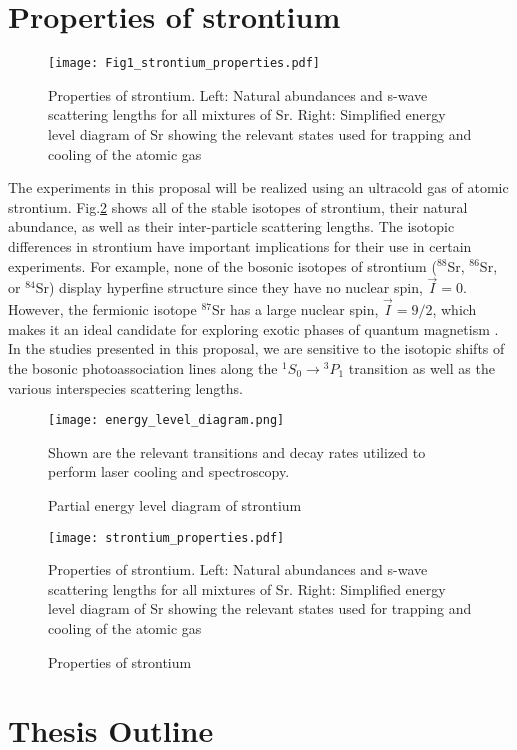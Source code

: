 \section{Properties of strontium}
\label{sec:sr}

	

	\begin{figure}
		\centerline{
		\texttt{[image: Fig1\_strontium\_properties.pdf]}}
		\caption{Properties of strontium. Left: Natural abundances and s-wave scattering lengths for all mixtures of Sr. Right: Simplified energy level diagram of Sr showing the relevant states used for trapping and cooling of the atomic gas}
	\end{figure} 
The experiments in this proposal will be realized using an ultracold gas of atomic strontium. Fig.\;\ref{fig:energy_level_diagram} shows all of the stable isotopes of strontium, their natural abundance, as well as their inter-particle scattering lengths. The isotopic differences in strontium have important implications for their use in certain experiments. For example, none of the bosonic isotopes of strontium ($^{88}$Sr, $^{86}$Sr, or $^{84}$Sr) display hyperfine structure since they have no nuclear spin, $\vec{I}=0$. However, the fermionic isotope $^{87}$Sr has a large nuclear spin, $\vec{I}=9/2$, which makes it an ideal candidate for exploring exotic phases of quantum magnetism \cite{Beverland2016,Cazalilla2014,Chen2015}. In the studies presented in this proposal, we are sensitive to the isotopic shifts of the bosonic photoassociation lines along the $^1S_0\!\rightarrow\!^3P_1$ transition as well as the various interspecies scattering lengths.

	\begin{figure} 
		\centerline{
		\texttt{[image: energy\_level\_diagram.png]}}
		\caption{Partial energy level diagram of strontium}{Shown are the relevant transitions and decay rates utilized to perform laser cooling and spectroscopy.}
		\label{fig:energyLevels}
	\end{figure}

\begin{figure}
\label{fig:energy_level_diagram}
	\centerline{
	\texttt{[image: strontium\_properties.pdf]}}
	\caption{Properties of strontium}{Properties of strontium. Left: Natural abundances and s-wave scattering lengths for all mixtures of Sr. Right: Simplified energy level diagram of Sr showing the relevant states used for trapping and cooling of the atomic gas}
\end{figure} 

\section{Thesis Outline}
\label{sec:outline}

